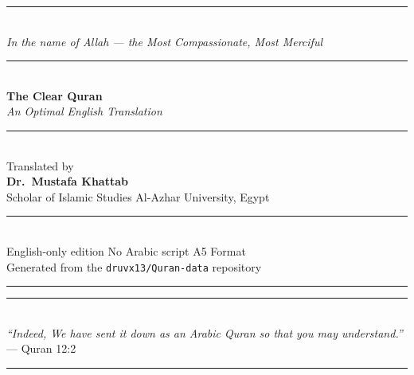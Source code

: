 \documentclass[11pt, twoside, openright]{book}
\begin{document}
\begin{titlepage}
\thispagestyle{empty}

\begin{center}
\vspace*{24mm}

\textcolor{goldenbrown}{\rule{80mm}{0.6pt}}\\[6mm]
{\footnotesize\textcolor{muted}{\textit{In the name of Allah — the Most Compassionate, Most Merciful}}}\\[8mm]
\textcolor{goldenbrown}{\rule{80mm}{0.6pt}}\\[14mm]

{\fontsize{30}{36}\selectfont\bfseries\color{deepbrown} The Clear Quran}\\[5mm]
{\fontsize{14}{18}\selectfont\textcolor{muted}{\textit{An Optimal English Translation}}}\\[18mm]

\textcolor{goldenbrown}{\rule{40mm}{0.4pt}}\\[12mm]

{\fontsize{12}{16}\selectfont\color{deepbrown} Translated by}\\[3mm]
{\fontsize{14}{18}\selectfont\bfseries\color{deepbrown} Dr.\ Mustafa Khattab}\\[4mm]
{\fontsize{10}{14}\selectfont\textcolor{muted}{Scholar of Islamic Studies \textbullet{} Al-Azhar University, Egypt}}

\vfill

\textcolor{goldenbrown}{\rule{60mm}{0.4pt}}\\[8mm]
{\small\textcolor{muted}{%
  English-only edition \textbullet{} No Arabic script \textbullet{} A5 Format\\[3mm]
  Generated from the \texttt{druvx13/Quran-data} repository
}}\\[6mm]
\textcolor{goldenbrown}{\rule{60mm}{0.4pt}}

\end{center}
\end{titlepage}

\frontmatter

\thispagestyle{empty}
\vspace*{\fill}
\begin{center}
{
\textcolor{goldenbrown}{\rule{50mm}{0.4pt}}\\[10mm]
{\large\textit{%
  ``Indeed, We have sent it down as an Arabic Quran so that you may understand.''}%
}\\[4mm]
{\small\textcolor{muted}— Quran 12:2}\\[10mm]
\textcolor{goldenbrown}{\rule{50mm}{0.4pt}}
}
\end{center}
\vspace*{\fill}
\clearpage
\end{document}
